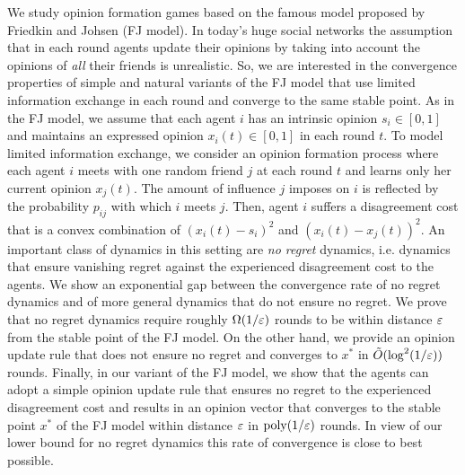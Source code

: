 We study opinion formation games based on the famous model proposed by Friedkin
and Johsen (FJ model). In today's huge social networks the assumption that in
each round agents update their opinions by taking into account the opinions of
\emph{all} their friends is unrealistic. So, we are interested in the convergence
properties of simple and natural variants of the FJ model that use limited
information exchange in each round and converge to the same stable point.
%
As in the FJ model, we assume that each agent $i$ has an intrinsic opinion $s_i
\in [0,1]$ and maintains an expressed opinion $x_i(t) \in [0,1]$ in each round
$t$. To model limited information exchange, we consider an opinion formation
process where each agent $i$ meets with  one random friend $j$ at each round
$t$ and learns only her current opinion $x_j(t)$. The amount of influence $j$
imposes on $i$ is reflected by the probability $p_{ij}$ with which $i$ meets
$j$. Then, agent $i$ suffers a disagreement cost that is a convex combination
of $(x_i(t) - s_i)^2$ and $(x_i(t) - x_j(t))^2$.
%
An important class of dynamics in this setting are \emph{no regret} dynamics,
i.e. dynamics that ensure vanishing regret against the experienced
disagreement cost to the agents.  We show an exponential gap between
the convergence rate of no regret dynamics and of more general
dynamics that do not ensure no regret.  We prove that no regret dynamics
require roughly $\Omega(1/\varepsilon)$ rounds to be within distance $\varepsilon$ from the stable
point of the FJ model.  On the other hand, we provide an opinion update rule that does
not ensure no regret and converges to $x^\ast$ in $\tilde{O}(\log^2(1/\varepsilon))$
rounds.  Finally, in our variant of the FJ model, we show that the agents can adopt
a simple opinion update rule that ensures no regret to the experienced disagreement
cost and results in an opinion vector that converges to the stable point $x^\ast$
of the FJ model within distance $\varepsilon$ in $\mathrm{poly}(1/\varepsilon)$ rounds. In view of our
lower bound for no regret dynamics this rate of convergence is close to best
possible.
